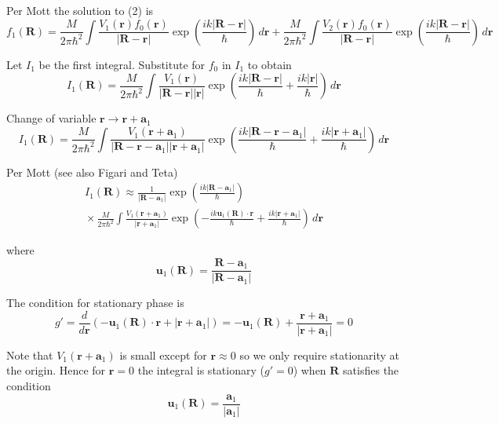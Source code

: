 \documentclass[12pt]{article}
\begin{document}
Per Mott the solution to (2) is
\begin{equation*}
f_1(\mathbf R)=
\frac{M}{2\pi\hbar^2}\int\frac{V_1(\mathbf r)f_0(\mathbf r)}{|\mathbf R-\mathbf r|}
\exp\left(\frac{ik|\mathbf R-\mathbf r|}{\hbar}\right)\,d\mathbf r
+\frac{M}{2\pi\hbar^2}\int\frac{V_2(\mathbf r)f_0(\mathbf r)}{|\mathbf R-\mathbf r|}
\exp\left(\frac{ik|\mathbf R-\mathbf r|}{\hbar}\right)\,d\mathbf r
\end{equation*}

Let $I_1$ be the first integral.
Substitute for $f_0$ in $I_1$ to obtain
\begin{equation*}
I_1(\mathbf R)=
\frac{M}{2\pi\hbar^2}\int\frac{V_1(\mathbf r)}{|\mathbf R-\mathbf r||\mathbf r|}
\exp\left(\frac{ik|\mathbf R-\mathbf r|}{\hbar}+\frac{ik|\mathbf r|}{\hbar}\right)\,d\mathbf r
\end{equation*}

Change of variable $\mathbf r\rightarrow\mathbf r+\mathbf a_1$
\begin{equation*}
I_1(\mathbf R)=
\frac{M}{2\pi\hbar^2}
\int
\frac{V_1(\mathbf r+\mathbf a_1)}{|\mathbf R-\mathbf r-\mathbf a_1||\mathbf r+\mathbf a_1|}
\exp\left(
\frac{ik|\mathbf R-\mathbf r-\mathbf a_1|}{\hbar}+\frac{ik|\mathbf r+\mathbf a_1|}{\hbar}
\right)\,d\mathbf r
\end{equation*}

Per Mott (see also Figari and Teta)
\begin{multline*}
I_1(\mathbf R)\approx\frac{1}{|\mathbf R-\mathbf a_1|}
\exp\left(\frac{ik|\mathbf R-\mathbf a_1|}{\hbar}\right)
\\
{}\times\frac{M}{2\pi\hbar^2}
\int
\frac{V_1(\mathbf r+\mathbf a_1)}{|\mathbf r+\mathbf a_1|}
\exp\left(-\frac{ik\mathbf u_1(\mathbf R)\cdot\mathbf r}{\hbar}
+\frac{ik|\mathbf r+\mathbf a_1|}{\hbar}\right)
\,d\mathbf r
\end{multline*}

where
\begin{equation*}
\mathbf u_1(\mathbf R)=\frac{\mathbf R-\mathbf a_1}{|\mathbf R-\mathbf a_1|}
\end{equation*}

The condition for stationary phase is
\begin{equation*}
g'=\frac{d}{d\mathbf r}\left(-\mathbf u_1(\mathbf R)\cdot\mathbf r+|\mathbf r+\mathbf a_1|\right)
=-\mathbf u_1(\mathbf R)+\frac{\mathbf r+\mathbf a_1}{|\mathbf r+\mathbf a_1|}=0
\end{equation*}

Note that $V_1(\mathbf r+\mathbf a_1)$ is small except for $\mathbf r\approx0$ so
we only require stationarity at the origin.
Hence for $\mathbf r=0$ the integral is stationary ($g'=0$)
when $\mathbf R$ satisfies the condition
\begin{equation*}
\mathbf u_1(\mathbf R)
=\frac{\mathbf a_1}{|\mathbf a_1|}
\end{equation*}
\end{document}
